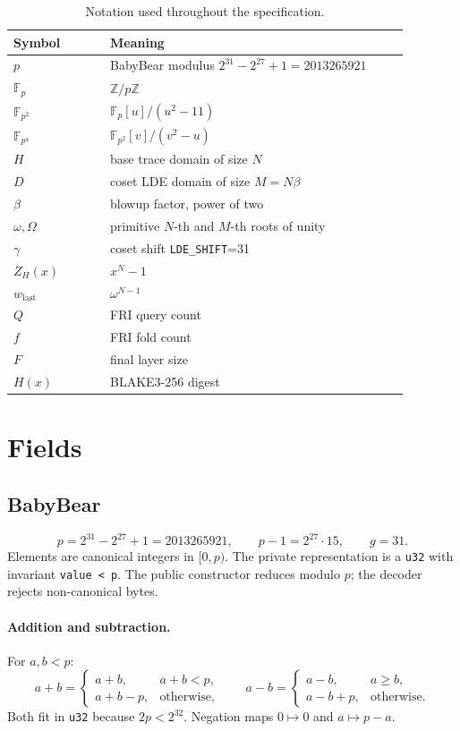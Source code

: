 \documentclass[11pt,a4paper]{article}
\newcommand{\yFp}{\mathbb{F}_p}
\newcommand{\yFpTwo}{\mathbb{F}_{p^2}}
\newcommand{\yFpFour}{\mathbb{F}_{p^4}}
\begin{document}
\begin{table}[h]
\centering
\small
\begin{tabular}{@{}L{0.22\linewidth}L{0.68\linewidth}@{}}
\toprule
Symbol & Meaning \\
\midrule
$p$ & BabyBear modulus $2^{31}-2^{27}+1=2013265921$ \\
$\yFp$ & $\mathbb{Z}/p\mathbb{Z}$ \\
$\yFpTwo$ & $\yFp[u]/(u^2-11)$ \\
$\yFpFour$ & $\yFpTwo[v]/(v^2-u)$ \\
$H$ & base trace domain of size $N$ \\
$D$ & coset LDE domain of size $M=N\beta$ \\
$\beta$ & blowup factor, power of two \\
$\omega,\Omega$ & primitive $N$-th and $M$-th roots of unity \\
$\gamma$ & coset shift \texttt{LDE\_SHIFT}=31 \\
$Z_H(x)$ & $x^N-1$ \\
$w_{\mathrm{last}}$ & $\omega^{N-1}$ \\
$Q$ & FRI query count \\
$f$ & FRI fold count \\
$F$ & final layer size \\
$H(x)$ & BLAKE3-256 digest \\
\bottomrule
\end{tabular}
\caption{Notation used throughout the specification.}
\end{table}

\section{Fields}

\subsection{BabyBear}

\[
p=2^{31}-2^{27}+1=2013265921,\qquad p-1=2^{27}\cdot15,\qquad g=31.
\]
Elements are canonical integers in $[0,p)$. The private representation is a
\texttt{u32} with invariant \texttt{value < p}. The public constructor reduces
modulo $p$; the decoder rejects non-canonical bytes.

\paragraph{Addition and subtraction.} For $a,b<p$:
\[
a+b=\begin{cases}a+b,&a+b<p,\\a+b-p,&\text{otherwise,}\end{cases}
\qquad
a-b=\begin{cases}a-b,&a\ge b,\\a-b+p,&\text{otherwise.}\end{cases}
\]
Both fit in \texttt{u32} because $2p<2^{32}$. Negation maps $0\mapsto0$ and
$a\mapsto p-a$.
\end{document}
